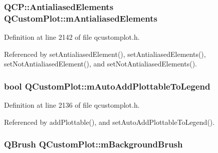 \hypertarget{class_q_custom_plot_aa333200629256830e273873b582a5524}{}
\subsubsection[{m\+Antialiased\+Elements}]{\setlength{\rightskip}{0pt plus 5cm}Q\+C\+P\+::\+Antialiased\+Elements Q\+Custom\+Plot\+::m\+Antialiased\+Elements\hspace{0.3cm}{\ttfamily [protected]}}\label{class_q_custom_plot_aa333200629256830e273873b582a5524}


Definition at line 2142 of file qcustomplot.\+h.



Referenced by set\+Antialiased\+Element(), set\+Antialiased\+Elements(), set\+Not\+Antialiased\+Element(), and set\+Not\+Antialiased\+Elements().

\hypertarget{class_q_custom_plot_aaf3ea6a4cb04d35a149cc9a0cdac3394}{}
\subsubsection[{m\+Auto\+Add\+Plottable\+To\+Legend}]{\setlength{\rightskip}{0pt plus 5cm}bool Q\+Custom\+Plot\+::m\+Auto\+Add\+Plottable\+To\+Legend\hspace{0.3cm}{\ttfamily [protected]}}\label{class_q_custom_plot_aaf3ea6a4cb04d35a149cc9a0cdac3394}


Definition at line 2136 of file qcustomplot.\+h.



Referenced by add\+Plottable(), and set\+Auto\+Add\+Plottable\+To\+Legend().

\hypertarget{class_q_custom_plot_a3aef5de4ac012178e3293248e9c63737}{}
\subsubsection[{m\+Background\+Brush}]{\setlength{\rightskip}{0pt plus 5cm}Q\+Brush Q\+Custom\+Plot\+::m\+Background\+Brush\hspace{0.3cm}{\ttfamily [protected]}}\label{class_q_custom_plot_a3aef5de4ac012178e3293248e9c63737}



